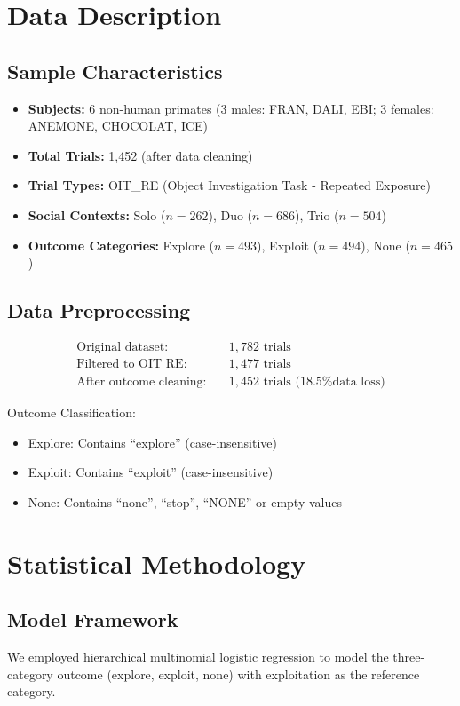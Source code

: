 \documentclass[11pt,a4paper]{article}
\begin{document}
\section{Data Description}

\subsection{Sample Characteristics}
\begin{itemize}
    \item \textbf{Subjects:} 6 non-human primates (3 males: FRAN, DALI, EBI; 3 females: ANEMONE, CHOCOLAT, ICE)
    \item \textbf{Total Trials:} 1,452 (after data cleaning)
    \item \textbf{Trial Types:} OIT\_RE (Object Investigation Task - Repeated Exposure)
    \item \textbf{Social Contexts:} Solo ($n = 262$), Duo ($n = 686$), Trio ($n = 504$)
    \item \textbf{Outcome Categories:} Explore ($n = 493$), Exploit ($n = 494$), None ($n = 465$)
\end{itemize}

\subsection{Data Preprocessing}
\begin{align}
\text{Original dataset:} &\quad 1,782 \text{ trials}\\
\text{Filtered to OIT\_RE:} &\quad 1,477 \text{ trials}\\
\text{After outcome cleaning:} &\quad 1,452 \text{ trials (18.5\% data loss)}
\end{align}

Outcome Classification:
\begin{itemize}
    \item Explore: Contains ``explore'' (case-insensitive)
    \item Exploit: Contains ``exploit'' (case-insensitive)
    \item None: Contains ``none'', ``stop'', ``NONE'' or empty values
\end{itemize}

\section{Statistical Methodology}

\subsection{Model Framework}
We employed hierarchical multinomial logistic regression to model the three-category outcome (explore, exploit, none) with exploitation as the reference category.
\end{document}
